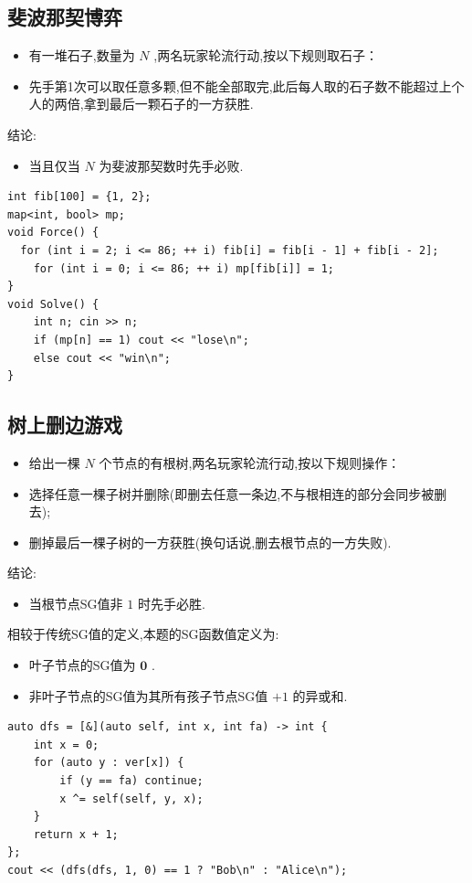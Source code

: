 \subsection{斐波那契博弈}
\begin{itemize}
    \item 有一堆石子,数量为 $N$ ,两名玩家轮流行动,按以下规则取石子：
    \item 先手第1次可以取任意多颗,但不能全部取完,此后每人取的石子数不能超过上个人的两倍,拿到最后一颗石子的一方获胜.
\end{itemize}

结论:
\begin{itemize}
    \item 当且仅当 $N$ 为斐波那契数时先手必败.
\end{itemize}
\begin{lstlisting}[caption={}]
int fib[100] = {1, 2};
map<int, bool> mp;
void Force() {
  for (int i = 2; i <= 86; ++ i) fib[i] = fib[i - 1] + fib[i - 2];
    for (int i = 0; i <= 86; ++ i) mp[fib[i]] = 1;
}
void Solve() {
    int n; cin >> n;
    if (mp[n] == 1) cout << "lose\n";
    else cout << "win\n";
}
\end{lstlisting}







\subsection{树上删边游戏}
\begin{itemize}
    \item 给出一棵 $N$ 个节点的有根树,两名玩家轮流行动,按以下规则操作：
    \item 选择任意一棵子树并删除(即删去任意一条边,不与根相连的部分会同步被删去);
    \item 删掉最后一棵子树的一方获胜(换句话说,删去根节点的一方失败).
\end{itemize}

结论:
\begin{itemize}
    \item 当根节点SG值非 $1$ 时先手必胜.
\end{itemize}

相较于传统SG值的定义,本题的SG函数值定义为:
\begin{itemize}
    \item 叶子节点的SG值为 $\pmb 0$ .
    \item 非叶子节点的SG值为其所有孩子节点SG值 $\pmb + 1$ 的异或和.
\end{itemize}
\begin{lstlisting}[caption={}]
auto dfs = [&](auto self, int x, int fa) -> int {
    int x = 0;
    for (auto y : ver[x]) {
        if (y == fa) continue;
        x ^= self(self, y, x);
    }
    return x + 1;
};
cout << (dfs(dfs, 1, 0) == 1 ? "Bob\n" : "Alice\n");
\end{lstlisting}





